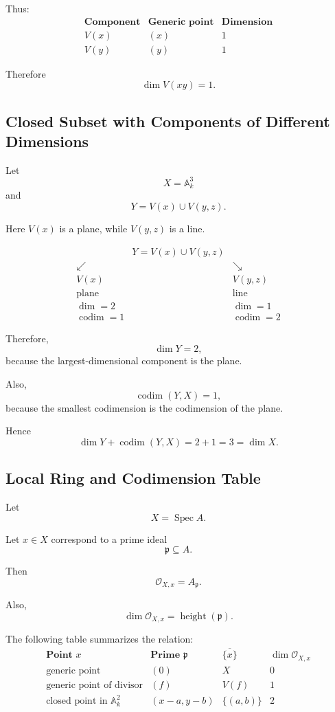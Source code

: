 \documentclass[12pt,a4paper]{article}
\theoremstyle{notespace}
\begin{document}
Thus:
\[
\begin{array}{c|c|c}
	\textbf{Component}
	&
	\textbf{Generic point}
	&
	\textbf{Dimension}
	\\
	\hline
	V(x)
	&
	(x)
	&
	1
	\\
	V(y)
	&
	(y)
	&
	1
\end{array}
\]

Therefore
\[
\dim V(xy)=1.
\]

\subsection{Closed Subset with Components of Different Dimensions}

Let
\[
X=\mathbb A^3_k
\]
and
\[
Y=V(x)\cup V(y,z).
\]

Here \(V(x)\) is a plane, while \(V(y,z)\) is a line.

\[
\begin{array}{ccc}
	& Y=V(x)\cup V(y,z) &
	\\[0.7em]
	\swarrow & & \searrow
	\\[0.7em]
	V(x) & & V(y,z)
	\\[0.4em]
	\text{plane} & & \text{line}
	\\[0.4em]
	\dim=2 & & \dim=1
	\\[0.4em]
	\operatorname{codim}=1 & & \operatorname{codim}=2
\end{array}
\]

Therefore,
\[
\dim Y=2,
\]
because the largest-dimensional component is the plane.

Also,
\[
\operatorname{codim}(Y,X)=1,
\]
because the smallest codimension is the codimension of the plane.

Hence
\[
\dim Y+\operatorname{codim}(Y,X)
=
2+1
=
3
=
\dim X.
\]

\subsection{Local Ring and Codimension Table}

Let
\[
X=\operatorname{Spec} A.
\]

Let \(x\in X\) correspond to a prime ideal
\[
\mathfrak p\subseteq A.
\]

Then
\[
\mathcal O_{X,x}=A_{\mathfrak p}.
\]

Also,
\[
\dim \mathcal O_{X,x}
=
\operatorname{height}(\mathfrak p).
\]

The following table summarizes the relation:
\[
\begin{array}{c|c|c|c}
	\textbf{Point }x
	&
	\textbf{Prime } \mathfrak p
	&
	\overline{\{x\}}
	&
	\dim \mathcal O_{X,x}
	\\
	\hline
	\text{generic point}
	&
	(0)
	&
	X
	&
	0
	\\
	\text{generic point of divisor}
	&
	(f)
	&
	V(f)
	&
	1
	\\
	\text{closed point in }\mathbb A^2_k
	&
	(x-a,y-b)
	&
	\{(a,b)\}
	&
	2
\end{array}
\]
\end{document}
